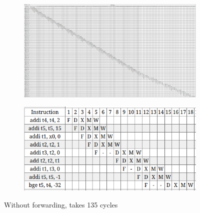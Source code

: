 \documentclass[11pt]{article}
\begin{document}
\begin{figure}[H]
\begin{subfigure}{.5\textwidth}
  \centering
  \includegraphics[width=\linewidth]{q1/nox/bad/nof-135.png}
\end{subfigure}
\begin{subfigure}{.5\textwidth}
  \centering
  \includegraphics[width=\linewidth]{q1/nox/bad/nof-loop.png}
\end{subfigure}
\caption{Without forwarding, takes 135 cycles}
\end{figure}
\end{document}
